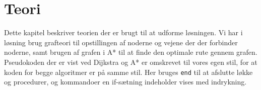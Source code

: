 \chapter{Teori}\label{Teori}
Dette kapitel beskriver teorien der er brugt til at udforme løsningen. Vi har i løsning brug grafteori til opstillingen af noderne og vejene der der forbinder noderne, samt brugen af grafen i A* til at finde den optimale rute gennem grafen. Pseudokoden der er vist ved Dijkstra og A* er omskrevet til vores egen stil, for at koden for begge algoritmer er på samme stil. Her bruges \texttt{end} til at afslutte løkke og procedurer, og kommandoer en if-sætning indeholder vises med indrykning.
\newpage

\newpage

















